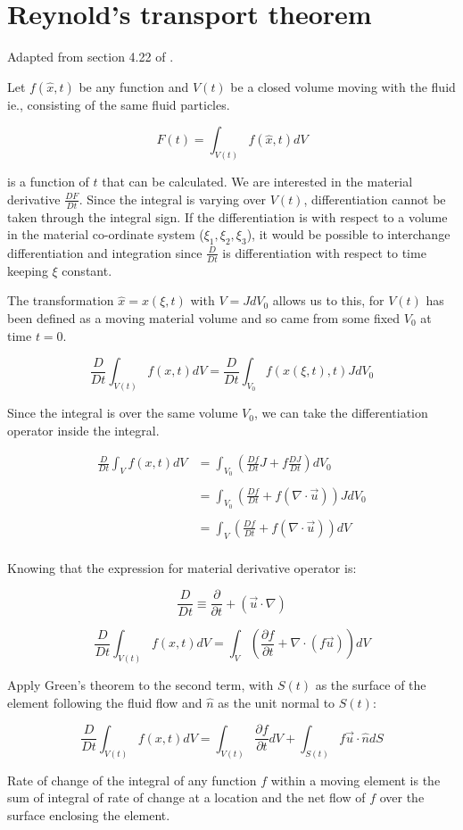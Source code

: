 \section{Reynold's transport theorem}
\label{rtt}

Adapted from section 4.22 of \cite{aris}.

Let $f(\hat{x},t)$ be any function and $V(t)$ be a closed volume moving with the fluid ie., consisting of the same fluid particles. 

$$ F(t) = \int_{V(t)}{f(\hat{x},t) dV}$$

is a function of $t$ that can be calculated. We are interested in the material derivative $\frac{DF}{Dt}$. Since the integral is varying over $V(t)$, differentiation cannot be taken through the integral sign. If the differentiation is with respect to a volume in the material co-ordinate system ($\xi_1, \xi_2, \xi_3$), it would be possible to interchange differentiation and integration since  $\frac{D}{Dt}$ is differentiation with respect to time keeping $\xi$ constant.

The transformation $\hat{x} = x(\xi , t)$ with $V=JdV_0$ allows us to this, for $V(t)$ has been defined as a moving material volume and so came from some fixed $V_0$ at time $t=0$.

$$ \frac{D}{Dt} \int_{V(t)}{f(x,t) dV} = \frac{D}{Dt} \int_{V_0}{f(x(\xi,t),t) J dV_0} $$

Since the integral is over the same volume $V_0$, we can take the differentiation operator inside the integral.

\begin{equation}
\begin{array}{rl}
\frac{D}{Dt} \int_{V}{f(x,t) dV} & = \int_{V_0}{\left( \frac{Df}{Dt}J+f\frac{DJ}{Dt}\right) dV_0} \\
\\
& = \int_{V_0}{\left( \frac{Df}{Dt}+f (\nabla \cdot \vec{u}) \right) JdV_0} \\
\\
& = \int_{V}{\left( \frac{Df}{Dt}+f (\nabla \cdot \vec{u}) \right) dV} \\
\end{array}
\end{equation}

Knowing that the expression for material derivative operator is:

$$ \frac{D}{Dt} \equiv \frac{\partial}{\partial t} + (\vec{u} \cdot \nabla) $$

$$ \frac{D}{Dt} \int_{V(t)}{f(x,t) dV} = \int_{V}{\left( \frac{\partial f}{\partial t}+ \nabla \cdot (f\vec{u}) \right) dV} $$

Apply Green's theorem to the second term, with $S(t)$ as the surface of the element following the fluid flow and $\hat{n}$ as the unit normal to $S(t)$:

$$ \boxed{ \frac{D}{Dt} \int_{V(t)}{f(x,t) dV} = \int_{V(t)}{\frac{\partial f}{\partial t} dV} + \int_{S(t)}{f \vec{u} \cdot \hat{n} dS} }$$

Rate of change of the integral of any function $f$ within a moving element is the sum of integral of rate of change at a location and the net flow of $f$ over the surface enclosing the element.

